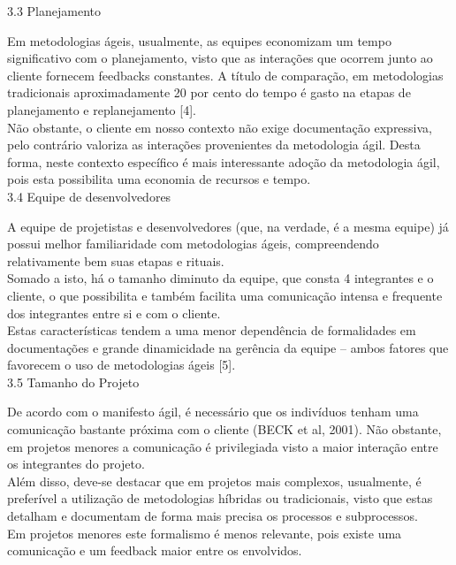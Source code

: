{\large{3.3 Planejamento\\}}

\tab Em metodologias ágeis, usualmente, as equipes economizam um tempo significativo com o planejamento, visto que as interações que ocorrem junto ao cliente fornecem feedbacks constantes. A título de comparação, em metodologias tradicionais aproximadamente 20 por cento do tempo é gasto na etapas de planejamento e replanejamento [4]. \\
\tab Não obstante, o cliente em nosso contexto não exige documentação expressiva, pelo contrário valoriza as interações provenientes da metodologia ágil. Desta forma, neste contexto  específico é mais interessante adoção da metodologia ágil,  pois esta  possibilita uma economia de recursos e tempo. \\


{\large{3.4 Equipe de desenvolvedores\\}}

\tab A equipe de projetistas e desenvolvedores (que, na verdade, é a mesma equipe) já possui melhor familiaridade com metodologias ágeis, compreendendo relativamente bem suas etapas e rituais. \\
\tab Somado a isto, há o tamanho diminuto da equipe, que consta 4 integrantes e o cliente, o que possibilita e também facilita uma comunicação intensa e frequente dos integrantes entre si e com o cliente. \\
\tab Estas características tendem a uma menor dependência de formalidades em documentações e grande dinamicidade na gerência da equipe – ambos fatores que favorecem o uso de metodologias ágeis [5]. \\



{\large{3.5 Tamanho do Projeto\\}}

\tab De acordo com o manifesto ágil, é necessário que os indivíduos tenham uma comunicação bastante próxima com o cliente (BECK et al, 2001). Não obstante, em projetos menores a comunicação é privilegiada visto a maior interação entre os integrantes do projeto. \\
\tab Além disso, deve-se destacar que em projetos mais complexos, usualmente,  é preferível a utilização de metodologias híbridas ou tradicionais, visto que estas detalham e documentam de forma mais precisa os processos e subprocessos. \\
\tab Em projetos menores este formalismo é menos relevante, pois existe uma comunicação e um feedback maior entre os envolvidos. \\



